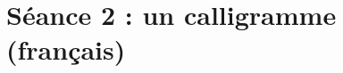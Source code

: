 \vfill





%
%
%










\newpage


\section{Séance 2 : un calligramme (français)}\label{ficheImage4e1}


